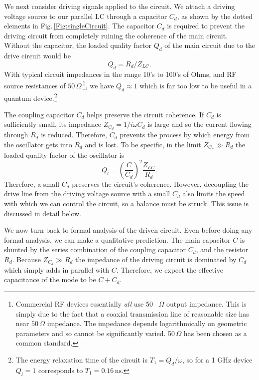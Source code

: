  \label{sec:driving}


We next consider driving signals applied to the circuit.
We attach a driving voltage source to our parallel LC through a capacitor $C_d$, as shown by the dotted elements in Fig.\,\ref{Fig:singleCircuit}.
The capacitor $C_d$ is required to prevent the driving circuit from completely ruining the coherence of the main circuit.
Without the capacitor, the loaded quality factor $Q_d$ of the main circuit due to the drive circuit would be 
\begin{equation}
Q_d = R_d / Z_{LC} .
\end{equation}
With typical circuit impedances in the range 10's to 100's of Ohms, and RF source resistances of $50\,\Omega$\,\footnote{Commercial RF devices essentially \emph{all} use 50 \, $\Omega$ output impedance. This is simply due to the fact that a coaxial transmission line of reasonable size has near $50 \, \Omega$ impedance. The impedance depends logarithmically on geometric parameters and so cannot be significantly varied. 50$ \, \Omega$ has been chosen as a common standard.}, we have $Q_d \approx 1$ which is far too low to be useful in a quantum device.\footnote{The energy relaxation time of the circuit is $T_1 = Q_d / \omega$, so for a 1 GHz device $Q_l=1$ corresponds to $T_1=0.16 \, \text{ns}$.}

The coupling capacitor $C_d$ helps preserve the circuit coherence.
If $C_d$ is sufficiently small, its impedance $Z_{C_d} = 1/i\omega C_d$ is large and so the current flowing through $R_d$ is reduced.
Therefore, $C_d$ prevents the process by which energy from the oscillator gets into $R_d$ and is lost.
To be specific, in the limit $Z_{C_d} \gg R_d$ the loaded quality factor of the oscillator is 
\begin{equation}
Q_l = \left( \frac{C}{C_d} \right)^2 \frac{Z_{LC}}{R_d} .
\end{equation}
Therefore, a small $C_d$ preserves the circuit's coherence.
However, decoupling the drive line from the driving voltage source with a small $C_d$ also limits the speed with which we can control the circuit, so a balance must be struck.
This issue is discussed in detail below.

We now turn back to formal analysis of the driven circuit.
Even before doing any formal analysis, we can make a qualitative prediction.
The main capacitor $C$ is shunted by the series combination of the coupling capacitor $C_d$, and the resistor $R_d$.
Because  $Z_{C_d} \gg R_d$ the impedance of the driving circuit is dominated by $C_d$ which simply adds in parallel with $C$.
Therefore, we expect the effective capacitance of the mode to be $C+C_d$.

